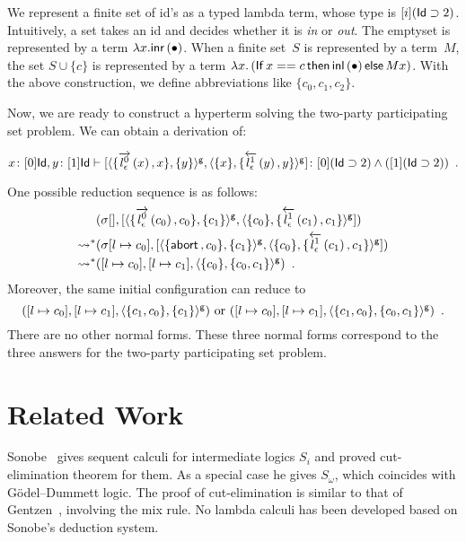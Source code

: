{We represent a finite set of id's as a
typed lambda term, whose type is $[i](\Id\supset 2)$.  Intuitively, a
set takes an id and decides whether it is \textit{in} or \textit{out}.
The emptyset is represented by a term $\lambda x. \linr {\bullet}$.
When a finite set~$S$ is represented by a term~$M$,
the set $S \cup \{c\}$ is represented by a term
$\lambda x.\left(\ifte{x==c}{\linl {\bullet}}{Mx}\right)$.
With the above construction, we define abbreviations
like $\{c_0, c_1, c_2\}$.

Now, we are ready to construct a hyperterm solving the two-party
participating set problem.
We can  obtain a derivation of:
\begin{center}
 \small
$
 \tj{x}{[0]\Id},
 \tj{y}{[1]\Id}
 \tr
 \tj{\cotuple{\gpair{\{\ltor 0 l \epsilon x, x\}, \{y\}},
 \gpair{\{x\}, \{\rtol 1 l\epsilon y, y\}}
 }}
 {[0](\Id\supset 2)\wedge ([1](\Id\supset 2))}\enspace.$
\end{center}

One possible reduction sequence is as follows:
\begin{align*}
 & \conf{[]}
 {\cotuple{\gpair{\{\ltor 0 l \epsilon {c_0}, {c_0}\}, \{{c_1}\}},
 \gpair {\{{c_0}\}, \{\rtol 1 l\epsilon {c_1}, {c_1}\}}}} \\
 \reduction &
 \conf{[l\mapsto {c_0}]}
 {
 \cotuple{
 \gpair{\{\abort, {c_0}\}, \{{c_1}\}},
 \gpair{\{{c_0}\}, \{\rtol 1 l\epsilon {c_1}, {c_1}\}}
 }
 }
 \\
 \reduction &
 \concreteconf{[l\mapsto {c_0}]}{[l\mapsto {c_1}]}{\gpair{\{{c_0}\}, \{c_0, c_1\}}}\enspace.
\end{align*}
Moreover, the same initial configuration can reduce to
\[
 \concreteconf{[l\mapsto c_0]}{[l\mapsto c_1]}{\gpair{\{c_1,c_0\},
 \{c_1\}}}\text{ or }
 \concreteconf{[l\mapsto c_0]}{[l\mapsto c_1]}{\gpair{\{c_1,c_0\},
 \{c_0, c_1\}}}\enspace.
\]
There are no other normal forms.
These three normal forms correspond to the three answers for the
two-party participating set problem.

\section{Related Work}
\label{related}
Sonobe~\cite{sonobe} gives sequent calculi for intermediate logics $S_i$
and proved cut-elimination theorem for them.  As a special case he gives
$S_\omega$, which coincides with G\"odel--Dummett logic.
The proof of cut-elimination is similar to that of
Gentzen~\cite{gentzen}, involving the mix rule.
No lambda calculi has been developed based on Sonobe's deduction system.

}
